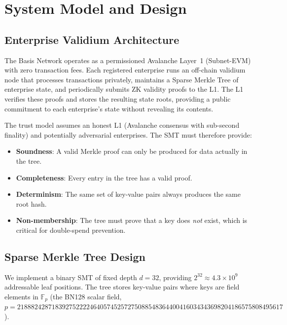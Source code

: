 
\section{System Model and Design}
\label{sec:system-model}

\subsection{Enterprise Validium Architecture}

The Basis Network operates as a permissioned Avalanche Layer~1 (Subnet-EVM) with zero transaction fees. Each registered enterprise runs an off-chain validium node that processes transactions privately, maintains a Sparse Merkle Tree of enterprise state, and periodically submits ZK validity proofs to the L1. The L1 verifies these proofs and stores the resulting state roots, providing a public commitment to each enterprise's state without revealing its contents.

The trust model assumes an honest L1 (Avalanche consensus with sub-second finality) and potentially adversarial enterprises. The SMT must therefore provide:

\begin{itemize}
  \item \textbf{Soundness}: A valid Merkle proof can only be produced for data actually in the tree.
  \item \textbf{Completeness}: Every entry in the tree has a valid proof.
  \item \textbf{Determinism}: The same set of key-value pairs always produces the same root hash.
  \item \textbf{Non-membership}: The tree must prove that a key does \emph{not} exist, which is critical for double-spend prevention.
\end{itemize}

\subsection{Sparse Merkle Tree Design}

We implement a binary SMT of fixed depth $d = 32$, providing $2^{32} \approx 4.3 \times 10^9$ addressable leaf positions. The tree stores key-value pairs where keys are field elements in $\mathbb{F}_p$ (the BN128 scalar field, $p = 21888242871839275222246405745257275088548364400416034343698204186575808495617$).

